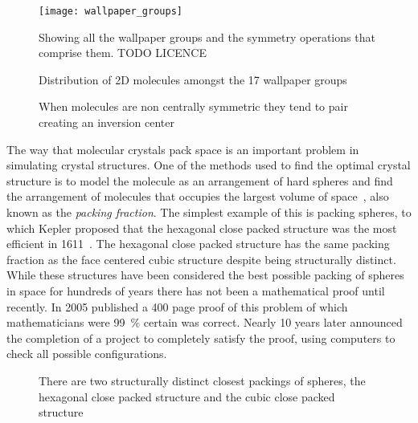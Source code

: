 \begin{figure}
    \texttt{[image: wallpaper\_groups]}
    \caption{Showing all the wallpaper groups and the symmetry operations that comprise them. TODO LICENCE}
    \label{fig:wallpaper}
\end{figure}

\begin{figure}
    \caption{Distribution of 2D molecules amongst the 17 wallpaper groups}
    \label{fig:wallpaper dist}
\end{figure}

\begin{figure}
    \caption{When molecules are non centrally symmetric they tend to pair creating an inversion center}
    \label{fig:molecule pair}
\end{figure}

The way that molecular crystals pack space is an important problem in simulating crystal structures. One of the methods used to find the optimal crystal structure is to model the molecule as an arrangement of hard spheres and find the arrangement of molecules that occupies the largest volume of space~\cite{kitaigorodskii:73}, also known as the \emph{packing fraction}. The simplest example of this is packing spheres, to which Kepler proposed that the hexagonal close packed structure was the most efficient in 1611~\cite{kepler:1611}. The hexagonal close packed structure has the same packing fraction as the face centered cubic structure despite being structurally distinct. While these structures have been considered the best possible packing of spheres in space for hundreds of years there has not been a mathematical proof until recently. In 2005 \textcite{hales:05} published a 400 page proof of this problem of which mathematicians were \SI{99}{\percent} certain was correct. Nearly 10 years later \textcite{hales:14} announced the completion of a project to completely satisfy the proof, using computers to check all possible configurations. 

\begin{figure}
    \caption{There are two structurally distinct closest packings of spheres, the hexagonal close packed structure and the cubic close packed structure}
    \label{fig:sphere packing}
\end{figure}

